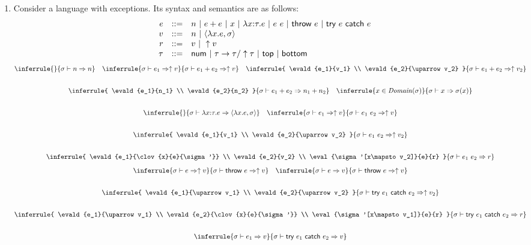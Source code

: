 \begin{enumerate}
\item Consider a language with exceptions. Its syntax and semantics are as
  follows:
\[
  \begin{array}{rrl}
    e & ::= & n\ |\ \eadd{e}{e}\ |\ x\ |\ \efunt{x}{\tau}{e}\ |\
    \eapp{e}{e}\ |\ \textsf{throw}\ e\ |\ \textsf{try}\ e\ \textsf{catch}\ e \\
    v & ::= & n\ |\ \clov{x}{e}{\sigma} \\
    r & ::= & v\ |\ \uparrow v \\
    \tau & ::= & \tnum\ |\ \tarrow{\tau}{\tau/\uparrow\tau} \ |\ \ttop\ |\ \tbot
  \end{array}
\]
\[
\begin{array}{@{}c}
  \inferrule
  {}
  { \evald{n}{n} }
  \quad
  \inferrule
  { \evald{e_1}{\uparrow v} }
  { \evald{\eadd{e_1}{e_2}}{\uparrow v} }
  \quad
  \inferrule
  { \evald{e_1}{v_1} \\
    \evald{e_2}{\uparrow v_2} }
  { \evald{\eadd{e_1}{e_2}}{\uparrow v_2} }
  \\[2em]
  \inferrule
  { \evald{e_1}{n_1} \\
    \evald{e_2}{n_2} }
  { \evald{\eadd{e_1}{e_2}}{n_1+n_2} }
  \quad
  \inferrule
  { x\in\dom{\sigma} }
  { \evald{x}{\sigma(x)} }
  \\[2em]
  \inferrule
  {}
  { \evald{\efunt{x}{\tau}{e}}{\clov{x}{e}{\sigma}} }
  \quad
  \inferrule
  { \evald{e_1}{\uparrow v} }
  { \evald{\eapp{e_1}{e_2}}{\uparrow v} }
  \\[2em]
  \inferrule
  { \evald{e_1}{v_1} \\
    \evald{e_2}{\uparrow v_2} }
  { \evald{\eapp{e_1}{e_2}}{\uparrow v_2} }
  \\[2em]
  \inferrule
  { \evald{e_1}{\clov{x}{e}{\sigma'}} \\
    \evald{e_2}{v_2} \\
    \eval{\sigma'[x\mapsto v_2]}{e}{r} }
  { \evald{\eapp{e_1}{e_2}}{r} }
\end{array}
\]
\[
\begin{array}{@{}c}
  \inferrule
  { \evald{e}{\uparrow v} }
  { \evald{\textsf{throw}\ e}{\uparrow v} }
  \quad
  \inferrule
  { \evald{e}{v} }
  { \evald{\textsf{throw}\ e}{\uparrow v} }
  \\[2em]
  \inferrule
  { \evald{e_1}{\uparrow v_1} \\ \evald{e_2}{\uparrow v_2} }
  { \evald{\textsf{try}\ e_1\ \textsf{catch}\ e_2}{\uparrow v_2} }
  \\[2em]
  \inferrule
  { \evald{e_1}{\uparrow v_1} \\
    \evald{e_2}{\clov{x}{e}{\sigma'}} \\
    \eval{\sigma'[x\mapsto v_1]}{e}{r} }
  { \evald{\textsf{try}\ e_1\ \textsf{catch}\ e_2}{r} }
  \\[2em]
  \inferrule
  { \evald{e_1}{v} }
  { \evald{\textsf{try}\ e_1\ \textsf{catch}\ e_2}{v} }
\end{array}
\]


\end{enumerate}
